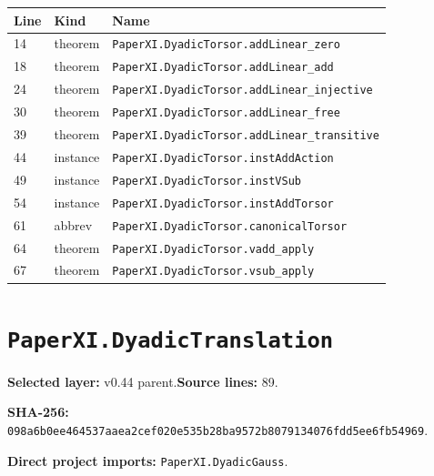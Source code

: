 \documentclass[10pt,oneside]{book}
\begin{document}
\begin{longtable}{@{}p{}p{}p{}@{}}\toprule Line&Kind&Name\\\midrule\endhead

14&theorem&\nolinkurl{PaperXI.DyadicTorsor.addLinear_zero}\\

18&theorem&\nolinkurl{PaperXI.DyadicTorsor.addLinear_add}\\

24&theorem&\nolinkurl{PaperXI.DyadicTorsor.addLinear_injective}\\

30&theorem&\nolinkurl{PaperXI.DyadicTorsor.addLinear_free}\\

39&theorem&\nolinkurl{PaperXI.DyadicTorsor.addLinear_transitive}\\

44&instance&\nolinkurl{PaperXI.DyadicTorsor.instAddAction}\\

49&instance&\nolinkurl{PaperXI.DyadicTorsor.instVSub}\\

54&instance&\nolinkurl{PaperXI.DyadicTorsor.instAddTorsor}\\

61&abbrev&\nolinkurl{PaperXI.DyadicTorsor.canonicalTorsor}\\

64&theorem&\nolinkurl{PaperXI.DyadicTorsor.vadd_apply}\\

67&theorem&\nolinkurl{PaperXI.DyadicTorsor.vsub_apply}\\

\bottomrule\end{longtable}

\section{\texorpdfstring{\nolinkurl{PaperXI.DyadicTranslation}}{PaperXI.DyadicTranslation}}\label{module:PaperXI.DyadicTranslation}

\textbf{Selected layer:} v0.44 parent.\quad\textbf{Source lines:} 89.\par\textbf{SHA-256:} {\scriptsize\nolinkurl{098a6b0ee464537aaea2cef020e535b28ba9572b8079134076fdd5ee6fb54969}}.

\textbf{Direct project imports:} \nolinkurl{PaperXI.DyadicGauss}.
\end{document}
